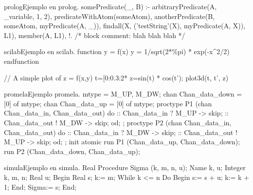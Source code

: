 
\begin{sourcecode}{prolog}{Ejemplo en prolog.}
somePredicate(_, B) :-
    arbitraryPredicate(A, _variable, 1, 2),
    predicateWithAtom(someAtom),
    anotherPredicate(B, someAtom, myPredicate(A, _)),
    findall(X, ('testString'(X), myPredicate(A, X)), L1),
    member(A, L1),
    !.
    /*
    block comment: blah blah blah
    */
\end{sourcecode}

\begin{sourcecode}{scilab}{Ejemplo en scilab.}
function y = f(x)
	y = 1/sqrt(2*\%pi) * exp(-x^2/2)
endfunction

// A simple plot of z = f(x,y)
t=[0:0.3:2*%
z=sin(t) * cos(t');
plot3d(t, t', z)
\end{sourcecode}

\begin{sourcecode}{promela}{Ejemplo promela.}
mtype = {M_UP, M_DW};
chan Chan_data_down = [0] of {mtype};
chan Chan_data_up   = [0] of {mtype};
proctype P1 (chan Chan_data_in, Chan_data_out)
{
    do
    ::  Chan_data_in  ? M_UP -> skip;
    ::  Chan_data_out ! M_DW -> skip;
    od;
};
proctype P2 (chan Chan_data_in, Chan_data_out)
{
    do
    ::  Chan_data_in  ? M_DW -> skip;
    ::  Chan_data_out ! M_UP -> skip;
    od;
};
init
{
    atomic
    {
        run P1 (Chan_data_up,   Chan_data_down);
        run P2 (Chan_data_down, Chan_data_up);
    }
}
\end{sourcecode}

\begin{sourcecode}{simula}{Ejemplo en simula.}
Real Procedure Sigma (k, m, n, u);
   Name k, u;
   Integer k, m, n; Real u;
Begin
   Real s;
   k:= m;
   While k <= n Do Begin s:= s + u; k:= k + 1; End;
   Sigma:= s;
End;
\end{sourcecode}


